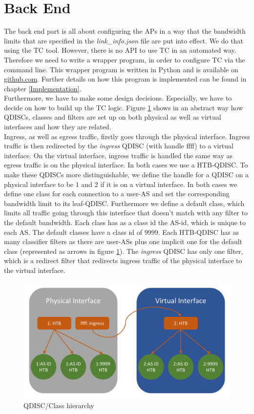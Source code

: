 \section{Back End}

The back end part is all about configuring the \acsp{AP} in a way that the bandwidth limits that are specified in the \textit{link\_info.json} file are put into effect. We do that using the \acs{TC} tool. However, there is no \acs{API} to use \acs{TC} in an automated way. Therefore we need to write a wrapper program, in order to configure \acs{TC} via the command line. This wrapper program is written in Python and is available on \href{https://github.com/ManuelMeinen/SCIONLab_Bandwidth_Limiter}{github.com}\cite{meinen2019scionlabBwLimiter}. Further details on how this program is implemented can be found in chapter \ref{Implementation}.
\\
Furthermore, we have to make some design decisions. Especially, we have to decide on how to build up the \acs{TC} logic. Figure \ref{QDISC-Set-up} shows in an abstract way how \acsp{QDISC}, classes and filters are set up on both physical as well as virtual interfaces and how they are related.
\\
Ingress, as well as egress traffic, firstly goes through the physical interface. Ingress traffic is then redirected by the \textit{ingress} \acs{QDISC} (with handle ffff) to a virtual interface. On the virtual interface, ingress traffic is handled the same way as egress traffic is on the physical interface. In both cases we use a \acs{HTB}-\acs{QDISC}. To make these \acsp{QDISC} more distinguishable, we define the handle for a \acs{QDISC} on a physical interface to be 1 and 2 if it is on a virtual interface. In both cases we define one class for each connection to a user-\acs{AS} and set the corresponding bandwidth limit to its leaf-\acs{QDISC}. Furthermore we define a default class, which limits all traffic going through this interface that doesn't match with any filter to the default bandwidth. Each class has as a class id the \acs{AS}-id, which is unique to each \acs{AS}. The default classes have a class id of 9999. Each \acs{HTB}-\acs{QDISC} has as many classifier filters as there are user-\acsp{AS} plus one implicit one for the default class (represented as arrows in figure \ref{QDISC-Set-up}). The \textit{ingress} \acs{QDISC} has only one filter, which is a redirect filter that redirects ingress traffic of the physical interface to the virtual interface.
\begin{figure}[h]
	\centering
	\includegraphics[width=\textwidth]{img/QDISC-Set-up.png}
	\caption{QDISC/Class hierarchy}
	\label{QDISC-Set-up}
\end{figure}
